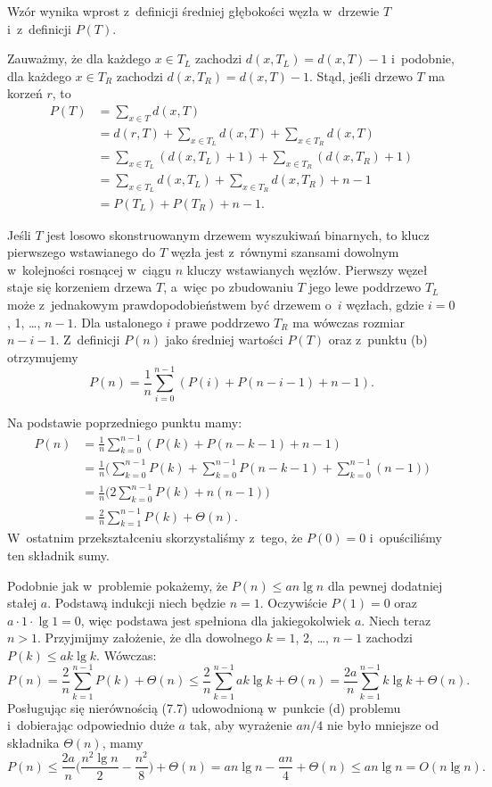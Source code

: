 \subproblem %
Wzór wynika wprost z~definicji średniej głębokości węzła w~drzewie $T$ i~z~definicji $P(T)$.

\subproblem %
Zauważmy, że dla każdego $x\in T_L$ zachodzi $d(x,T_L)=d(x,T)-1$ i~podobnie, dla każdego $x\in T_R$ zachodzi $d(x,T_R)=d(x,T)-1$.
Stąd, jeśli drzewo $T$ ma korzeń $r$, to
\begin{align*}
	P(T) &= \sum_{x\in T}d(x,T) \\
	&= d(r,T)+\sum_{x\in T_L}d(x,T)+\sum_{x\in T_R}d(x,T) \\[1mm]
	&= \sum_{x\in T_L}(d(x,T_L)+1)+\sum_{x\in T_R}(d(x,T_R)+1) \\[1mm]
	&= \sum_{x\in T_L}d(x,T_L)+\sum_{x\in T_R}d(x,T_R)+n-1 \\[1mm]
	&= P(T_L)+P(T_R)+n-1.
\end{align*}

\subproblem %
Jeśli $T$ jest losowo skonstruowanym drzewem wyszukiwań binarnych, to klucz pierwszego wstawianego do $T$ węzła jest z~równymi szansami dowolnym w~kolejności rosnącej w~ciągu $n$ kluczy wstawianych węzłów.
Pierwszy węzeł staje się korzeniem drzewa $T$, a~więc po zbudowaniu $T$ jego lewe poddrzewo $T_L$ może z~jednakowym prawdopodobieństwem być drzewem o~$i$ węzłach, gdzie $i=0$, 1, \dots, $n-1$.
Dla ustalonego $i$ prawe poddrzewo $T_R$ ma wówczas rozmiar $n-i-1$.
Z~definicji $P(n)$ jako średniej wartości $P(T)$ oraz z~punktu (b) otrzymujemy
\[
	P(n) = \frac{1}{n}\sum_{i=0}^{n-1}(P(i)+P(n-i-1)+n-1).
\]

\subproblem %
Na podstawie poprzedniego punktu mamy:
\begin{align*}
	P(n) &= \frac{1}{n}\sum_{k=0}^{n-1}(P(k)+P(n-k-1)+n-1) \\
	&= \frac{1}{n}\biggl(\sum_{k=0}^{n-1}P(k)+\sum_{k=0}^{n-1}P(n-k-1)+\sum_{k=0}^{n-1}(n-1)\biggr) \\
	&= \frac{1}{n}\biggl(2\sum_{k=0}^{n-1}P(k)+n(n-1)\biggr) \\
	&= \frac{2}{n}\sum_{k=1}^{n-1}P(k)+\Theta(n).
\end{align*}
W~ostatnim przekształceniu skorzystaliśmy z~tego, że $P(0)=0$ i~opuściliśmy ten składnik sumy.

\subproblem %
Podobnie jak w~problemie  pokażemy, że $P(n)\le an\lg n$ dla pewnej dodatniej stałej $a$.
Podstawą indukcji niech będzie $n=1$.
Oczywiście $P(1)=0$ oraz $a\cdot1\cdot\lg1=0$, więc podstawa jest spełniona dla jakiegokolwiek $a$.
Niech teraz $n>1$.
Przyjmijmy założenie, że dla dowolnego $k=1$, 2, \dots, $n-1$ zachodzi $P(k)\le ak\lg k$.
Wówczas:
\[
	P(n) = \frac{2}{n}\sum_{k=1}^{n-1}P(k)+\Theta(n) \le \frac{2}{n}\sum_{k=1}^{n-1}ak\lg k+\Theta(n) = \frac{2a}{n}\sum_{k=1}^{n-1}{k\lg k}+\Theta(n).
\]
Posługując się nierównością (7.7) udowodnioną w~punkcie (d) problemu  i~dobierając odpowiednio duże $a$ tak, aby wyrażenie $an/4$ nie było mniejsze od składnika $\Theta(n)$, mamy
\[
	P(n) \le \frac{2a}{n}\biggl(\frac{n^2\lg n}{2}-\frac{n^2}{8}\biggr)+\Theta(n) = an\lg n-\frac{an}{4}+\Theta(n) \le an\lg n = O(n\lg n).
\]

